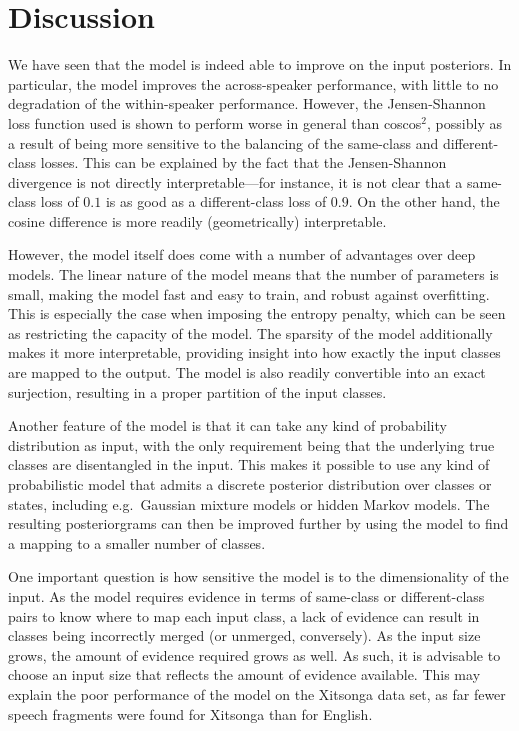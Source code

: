 \section{Discussion}
We have seen that the model is indeed able to improve on the input posteriors.
In particular, the model improves the across-speaker performance, with little to no degradation of the within-speaker performance.
However, the Jensen-Shannon loss function used is shown to perform worse in general than coscos$^2$, possibly as a result of being more sensitive to the balancing of the same-class and different-class losses.
This can be explained by the fact that the Jensen-Shannon divergence is not directly interpretable---for instance, it is not clear that a same-class loss of $0.1$ is as good as a different-class loss of $0.9$.
On the other hand, the cosine difference is more readily (geometrically) interpretable.

However, the model itself does come with a number of advantages over deep models.
The linear nature of the model means that the number of parameters is small, making the model fast and easy to train, and robust against overfitting.
This is especially the case when imposing the entropy penalty, which can be seen as restricting the capacity of the model.
The sparsity of the model additionally makes it more interpretable, providing insight into how exactly the input classes are mapped to the output.
The model is also readily convertible into an exact surjection, resulting in a proper partition of the input classes.

Another feature of the model is that it can take any kind of probability distribution as input, with the only requirement being that the underlying true classes are disentangled in the input.
This makes it possible to use any kind of probabilistic model that admits a discrete posterior distribution over classes or states, including e.g.\ Gaussian mixture models or hidden Markov models.
The resulting posteriorgrams can then be improved further by using the model to find a mapping to a smaller number of classes.

One important question is how sensitive the model is to the dimensionality of the input.
As the model requires evidence in terms of same-class or different-class pairs to know where to map each input class, a lack of evidence can result in classes being incorrectly merged (or unmerged, conversely).
As the input size grows, the amount of evidence required grows as well.
As such, it is advisable to choose an input size that reflects the amount of evidence available.
This may explain the poor performance of the model on the Xitsonga data set, as far fewer speech fragments were found for Xitsonga than for English.

